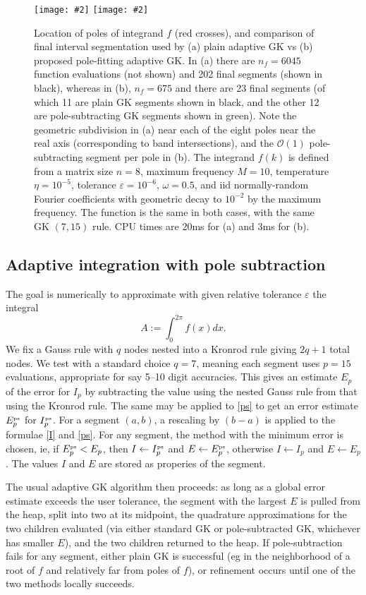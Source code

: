 \documentclass[11pt]{article}
\newcommand{\be}{\begin{equation}}
\newcommand{\ee}{\end{equation}}
\newcommand{\bfi}{\begin{figure}}
\newcommand{\efi}{\end{figure}}
\newcommand{\ca}[2]{\caption{#1 \label{#2}}}
\newcommand{\ig}[2]{\texttt{[image: \#2]}}
\newcommand{\tbox}[1]{{\mbox{\tiny #1}}}
\newcommand{\eps}{\varepsilon}
\newcommand{\bigO}{{\mathcal O}}
\begin{document}
  
\bfi %
\ig{width=\textwidth}{segsa}
\ig{width=\textwidth}{segsb}
\ca{Location of poles of integrand $f$ (red crosses),
  and comparison of final interval segmentation
  used by (a) plain adaptive GK vs (b) proposed pole-fitting adaptive GK.
  In (a) there are $n_f = 6045$ function evaluations (not shown) and 202 final segments
  (shown in black), whereas in (b), $n_f=675$ and there are 23 final segments
  (of which 11 are plain GK segments shown in black, and the other 12
  are pole-subtracting GK segments shown in green).
  Note the geometric subdivision in (a) near each of the
  eight poles near the real axis (corresponding to band intersections),
  and the $\bigO(1)$ pole-subtracting segment per pole in (b).
  The integrand $f(k)$ is defined from a matrix size
  $n=8$, maximum frequency $M=10$, temperature $\eta=10^{-5}$,
  tolerance $\eps=10^{-6}$, $\omega=0.5$, and iid normally-random
  Fourier coefficients with geometric decay to $10^{-2}$ by the maximum frequency.
  The function is the same in both cases, with the same GK $(7,15)$ rule.
  CPU times are 20ms for (a) and 3ms for (b).
}{f:polesegs}
\efi  %


\subsection{Adaptive integration with pole subtraction}
  
The goal is numerically to approximate with given relative tolerance $\eps$ the
integral
\be
A := \int_0^{2\pi} f(x) dx.
\label{Aagain}
\ee
We fix a Gauss rule with $q$ nodes nested into a Kronrod rule giving $2q+1$ total nodes.
We test with a standard choice $q=7$, meaning each segment uses $p=15$ evaluations,
appropriate for say 5--10 digit accuracies.
This gives an estimate $E_p$ of the error for $I_p$ by subtracting
the value using the nested Gauss rule from that using the Kronrod rule.
The same may be applied to \eqref{ps} to get an error estimate
$E^{\tbox{ps}}_p$ for $I^{\tbox{ps}}_p$.
For a segment $(a,b)$, a rescaling by $(b-a)$ is applied to the formulae
\eqref{I} and \eqref{ps}.
For any segment, the method with the minimum error is chosen, ie,
if $E^{\tbox{ps}}_p < E_p$, then
$I \leftarrow I^{\tbox{ps}}_p$ and $E \leftarrow E^{\tbox{ps}}_p$, otherwise
$I \leftarrow I_p$ and $E \leftarrow E_p$.
The values $I$ and $E$ are stored as properies of the segment.

The usual adaptive GK algorithm then proceeds:
as long as a global error estimate exceeds the user tolerance,
the segment with the largest $E$ is pulled from the heap,
split into two at its midpoint, the quadrature approximations for the two children
evaluated (via either standard GK or pole-subtracted GK, whichever has smaller $E$),
and the two children returned to the heap.
If pole-subtraction fails for any segment, either plain GK is successful
(eg in the neighborhood of a root of $f$ and relatively far from poles of $f$),
or refinement occurs until one of the two methods locally succeeds.
\end{document}
